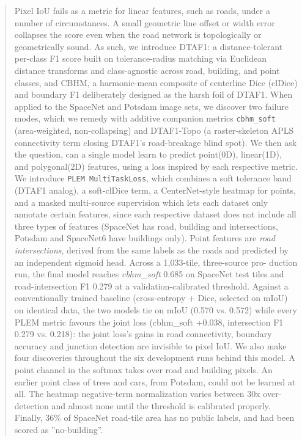 \begin{abstract}
Pixel IoU fails as a metric for linear features, such as roads, under a number of circumstances. A small geometric line offset or width error collapses the score even when the road network is topologically or geometrically sound. As such, we introduce DTAF1: a distance-tolerant per-class F1 score built on tolerance-radius matching via Euclidean
distance transforms and class-agnostic across road, building, and point classes, and CBHM, a harmonic-mean composite of centerline Dice (clDice) and boundary F1 deliberately designed as the harsh foil of DTAF1. When applied to the SpaceNet and Potsdam image sets, we discover two failure modes, which we remedy with additive companion metrics \texttt{cbhm\_soft} (area-weighted, non-collapsing) and DTAF1-Topo (a raster-skeleton APLS connectivity term closing DTAF1's road-breakage blind spot). We then ask the question, can a single model learn to predict point(0D), linear(1D), and polygonal(2D) features, using a loss inspired by each respective metric. We introduce \texttt{PLEM MultiTaskLoss}, which combines a soft tolerance band (DTAF1 analog), a soft-clDice term, a CenterNet-style heatmap for points, and a masked multi-source supervision which lets each dataset only annotate certain features, since each respective dataset does not include all three types of features (SpaceNet has road, building and intersections, Potsdam and SpaceNet6 have buildings only). Point features are \emph{road intersections}, derived from the same labels as the roads and predicted by an independent sigmoid head. Across a 1,033-tile, three-source pro- duction run, the final model reaches \emph{cbhm\_soft} 0.685 on SpaceNet test tiles and road-intersection F1 0.279 at a validation-calibrated threshold. Against a conventionally trained baseline (cross-entropy + Dice, selected on mIoU) on identical data, the two models tie on mIoU (0.570 vs. 0.572) while every PLEM metric favours the joint loss (cbhm\_soft +0.038, intersection F1 0.279 vs. 0.218): the joint loss’s gains in road connectivity, boundary accuracy and junction detection are invisible to pixel IoU. We also make four discoveries throughout the six development runs behind this model. A point channel in the softmax takes over road and building pixels. An earlier point class of trees and cars, from Potsdam, could not be learned at all. The heatmap negative-term normalization varies between 30x over-detection and almost none until the threshold is calibrated properly. Finally, 36\% of SpaceNet road-tile area has no public labels, and had been scored as ''no-building''.
\end{abstract}

